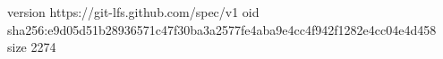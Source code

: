version https://git-lfs.github.com/spec/v1
oid sha256:e9d05d51b28936571c47f30ba3a2577fe4aba9e4cc4f942f1282e4cc04e4d458
size 2274
